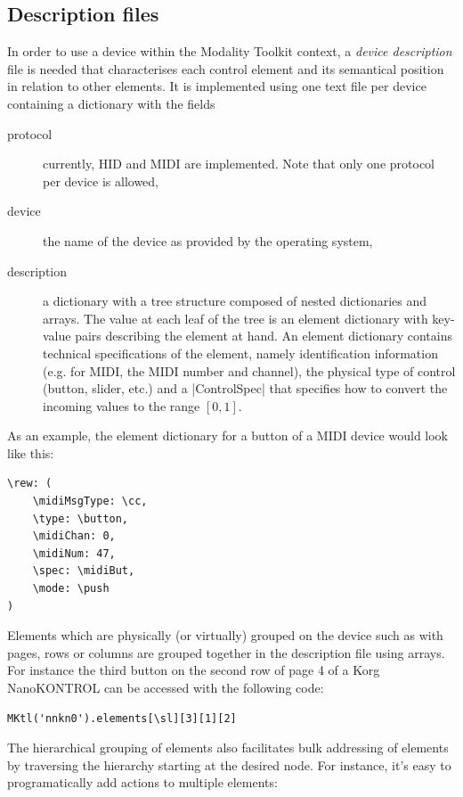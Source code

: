 \documentclass{article}
\begin{document}
\subsection{Description files}
\label{sub:descriptions_files}

In order to use a device within the Modality Toolkit context, a \textit{device description} file is needed that characterises each control element and its semantical position in relation to other elements.
It is implemented using one text file per device containing a dictionary with the fields 
\begin{description}
	\item[protocol] currently, HID and MIDI are implemented. Note that only one protocol per device is allowed,
	\item[device] the name of the device as provided by the operating system,
	\item[description] a dictionary with a tree structure composed of nested dictionaries and arrays. The value at each leaf of the tree is an element dictionary with key-value pairs describing the element at hand.
	An element dictionary contains technical specifications of the element, namely identification information (e.g. for MIDI, the MIDI number and channel), the physical type of control (button, slider, etc.) and a |ControlSpec| that specifies how to convert the incoming values to the range $[0,1]$.
\end{description}

As an example, the element dictionary for a button of a MIDI device would look like this:
\begin{Verbatim}
\rew: (
	\midiMsgType: \cc,
	\type: \button,
	\midiChan: 0,
	\midiNum: 47,
	\spec: \midiBut,
	\mode: \push
)
\end{Verbatim}

Elements which are physically (or virtually) grouped on the device such as with pages, rows or columns are grouped together in the description file using arrays. For instance the third button on the second row of page 4 of a Korg NanoKONTROL can be accessed with the following code:

\begin{Verbatim}
MKtl('nnkn0').elements[\sl][3][1][2]
\end{Verbatim}

The hierarchical grouping of elements also facilitates bulk addressing of elements by traversing the hierarchy starting at the desired node. For instance, it's easy to programatically add actions to multiple elements:
\end{document}
